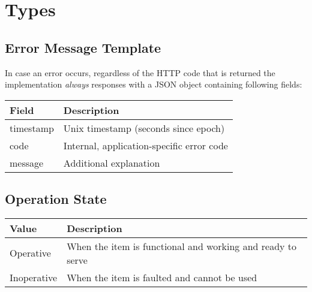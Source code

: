 \section{Types}

%

\subsection{Error Message Template}
\label{types:error-msg-template}

In case an error occurs, regardless of the HTTP code that is returned the implementation \textit{always} responses with a JSON object containing following fields: 

\begin{tabularx}{\linewidth}{ | l | X | }
  \hline
  \rowcolor{table-head}
  Field & Description \\
  \hline
  timestamp & Unix timestamp (seconds since epoch)  \\
  code 		& Internal, application-specific error code \\
  message 	& Additional explanation \\
  \hline
\end{tabularx}


\subsection{Operation State}
\label{types:OperationState}

\begin{tabularx}{\linewidth}{ | l | X | }
  \hline
  \rowcolor{table-head}
  Value & Description \\
  \hline
  Operative 		& When the item is functional and working and ready to serve \\
  Inoperative 	& When the item is faulted and cannot be used \\
  \hline
\end{tabularx}


